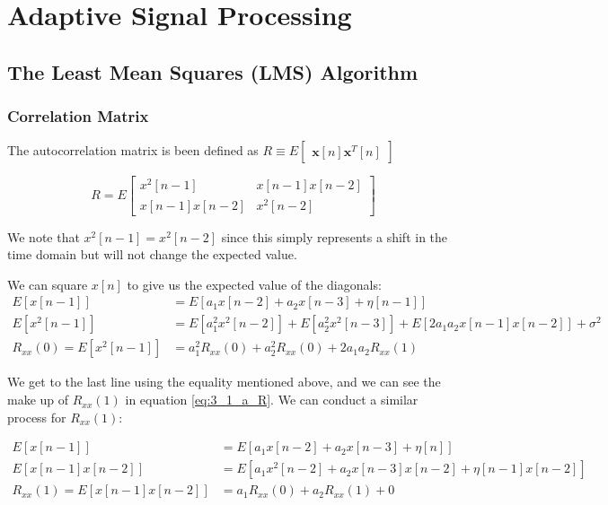 \documentclass[./main.tex]{subfiles}
\begin{document}
\section{Adaptive Signal Processing}

\subsection{The Least Mean Squares (LMS) Algorithm}

\subsubsection{Correlation Matrix}
The autocorrelation matrix is been defined as $ R \equiv E \begin{bmatrix} \mathbf{x}[n] \mathbf{x}^T[n] \end{bmatrix} $

\begin{equation}
R = E \begin{bmatrix}
x^2[n-1] & x[n-1] x[n-2] \\
x[n-1] x[n-2] & x^2[n-2]
\end{bmatrix}
\end{equation}
\label{eq:3_1_a_R}

We note that $x^2[n-1] = x^2[n-2] $ since this simply represents a shift in the time domain but will not change the expected value. 

We can square $x[n]$ to give us the expected value of the diagonals:
\begin{subequations}
\begin{align}
E[x[n-1]] &= E[ a_1 x[n - 2] + a_2 x[n-3] + \eta[n-1] ] \\
E[x^2[n-1]] &= E[ a_{1}^2 x^2[n - 2]] + E[ a_{2}^2 x^2[n-3]] + E[ 2 a_{1} a_{2} x[n-1] x[n-2]] + 
\sigma^2 \\
R_{xx}(0) = E[x^2[n-1]] &= a_1^2 R_{xx}(0) + a_2^2 R_{xx}(0) + 2 a_{1} a_{2} R_{xx}(1)
\end{align}
\end{subequations}

We get to the last line using the equality mentioned above, and we can see the make up of $R_{xx}(1)$ in equation \ref{eq:3_1_a_R}. We can conduct a similar process for $R_{xx}(1)$:

\begin{subequations}
\begin{align}
E[x[n-1]] &= E[ a_1 x[n - 2] + a_2 x[n-3] + \eta[n] ] \\
E[x[n-1]x[n-2]] &= E[ a_1 x^2[n - 2] + a_2 x[n-3]x[n-2] + \eta[n-1]x[n-2] ] \\
R_{xx}(1) = E[x[n-1]x[n-2]] &= a_1 R_{xx}(0) + a_2 R_{xx}(1) + 0
\end{align}
\end{subequations}
\end{document}
